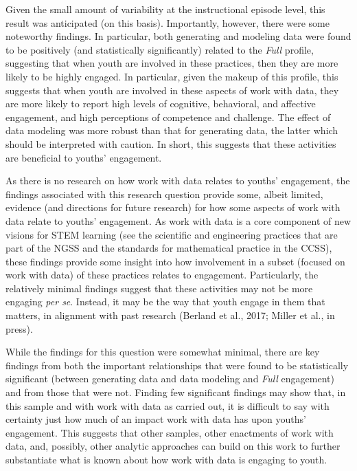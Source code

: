 \documentclass[]{msu-thesis}
\theoremstyle{definition}
\theoremstyle{definition}
\theoremstyle{definition}
\theoremstyle{remark}
\begin{document}
Given the small amount of variability at the instructional episode
level, this result was anticipated (on this basis). Importantly,
however, there were some noteworthy findings. In particular, both
generating and modeling data were found to be positively (and
statistically significantly) related to the \emph{Full} profile,
suggesting that when youth are involved in these practices, then they
are more likely to be highly engaged. In particular, given the makeup of
this profile, this suggests that when youth are involved in these
aspects of work with data, they are more likely to report high levels of
cognitive, behavioral, and affective engagement, and high perceptions of
competence and challenge. The effect of data modeling was more robust
than that for generating data, the latter which should be interpreted
with caution. In short, this suggests that these activities are
beneficial to youths' engagement.

As there is no research on how work with data relates to youths'
engagement, the findings associated with this research question provide
some, albeit limited, evidence (and directions for future research) for
how some aspects of work with data relate to youths' engagement. As work
with data is a core component of new visions for STEM learning (see the
scientific and engineering practices that are part of the NGSS and the
standards for mathematical practice in the CCSS), these findings provide
some insight into how involvement in a subset (focused on work with
data) of these practices relates to engagement. Particularly, the
relatively minimal findings suggest that these activities may not be
more engaging \emph{per se}. Instead, it may be the way that youth
engage in them that matters, in alignment with past research (Berland et
al., 2017; Miller et al., in press).

While the findings for this question were somewhat minimal, there are
key findings from both the important relationships that were found to be
statistically significant (between generating data and data modeling and
\emph{Full} engagement) and from those that were not. Finding few
significant findings may show that, in this sample and with work with
data as carried out, it is difficult to say with certainty just how much
of an impact work with data has upon youths' engagement. This suggests
that other samples, other enactments of work with data, and, possibly,
other analytic approaches can build on this work to further substantiate
what is known about how work with data is engaging to youth.
\end{document}

